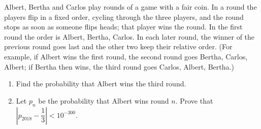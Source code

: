 Albert, Bertha and Carlos play rounds of a game with a fair coin. In a round the players flip in a fixed order, cycling through the three players, and the round stops as soon as someone flips heads; that player wins the round. In the first round the order is Albert, Bertha, Carlos. In each later round, the winner of the previous round goes last and the other two keep their relative order. (For example, if Albert wins the first round, the second round goes Bertha, Carlos, Albert; if Bertha then wins, the third round goes Carlos, Albert, Bertha.)
\begin{enumerate}
\item[(a)] Find the probability that Albert wins the third round.
\item[(b)] Let $p_n$ be the probability that Albert wins round $n$. Prove that $\left|p_{2018}-\dfrac{1}{3}\right|<10^{-300}$.
\end{enumerate}
